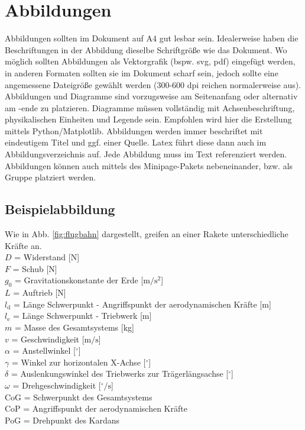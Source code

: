 \section{Abbildungen}
\label{subsec:abbildungen}
Abbildungen sollten im Dokument auf A4 gut lesbar sein. Idealerweise haben die Beschriftungen in der Abbildung dieselbe Schriftgröße wie das Dokument. Wo möglich sollten Abbildungen als Vektorgrafik (bspw. svg, pdf) eingefügt werden, in anderen Formaten sollten sie im Dokument scharf sein, jedoch sollte eine angemessene Dateigröße gewählt werden (300-600 dpi reichen normalerweise aus). Abbildungen und Diagramme sind vorzugsweise am Seitenanfang oder alternativ am -ende zu platzieren. Diagramme müssen vollständig mit Achsenbeschriftung, physikalischen Einheiten und Legende sein. Empfohlen wird hier die Erstellung mittels Python/Matplotlib. 
Abbildungen werden immer beschriftet mit eindeutigem Titel und ggf. einer Quelle. Latex führt diese dann auch im Abbildungsverzeichnis auf. 
Jede Abbildung muss im Text referenziert werden.
Abbildungen können auch mittels des Minipage-Pakets nebeneinander, bzw. als Gruppe platziert werden.
\subsection{Beispielabbildung}
\label{subsec:beispielabbildung}
Wie in Abb. \ref{fig:flugbahn} dargestellt, greifen an einer Rakete unterschiedliche Kräfte an.  \\
$D $ = Widerstand [N] \\
$F $ = Schub [N] \\
$g_0 $ = Gravitationskonstante der Erde [$\mathrm{m/s^2}$] \\
$L $ = Auftrieb [N] \\
$l_{\textrm{d}} $ = Länge Schwerpunkt - Angriffspunkt der aerodynamischen Kräfte [m] \\
$l_{\textrm{e}} $ = Länge Schwerpunkt - Triebwerk [m] \\
$m $ = Masse des Gesamtsystems [kg] \\
$v $ = Geschwindigkeit [$\mathrm{m/s}$] \\
$\alpha$ = Anstellwinkel [$^\circ$] \\
$\gamma$ = Winkel zur horizontalen X-Achse [$^\circ$] \\
$\delta$ = Auslenkungswinkel des Triebwerks zur Trägerlängsachse [$^\circ$] \\
$\omega$ = Drehgeschwindigkeit [$^\circ \mathrm{/s}$] \\
CoG = Schwerpunkt des Gesamtsystems \\
CoP = Angriffspunkt der aerodynamischen Kräfte \\
PoG = Drehpunkt des Kardans \\

